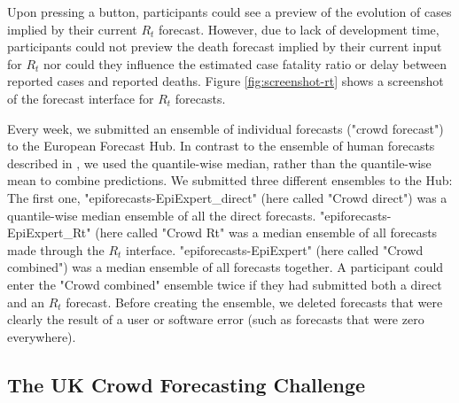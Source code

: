 \documentclass[10pt,a4paper,twocolumn]{article}
\begin{document}
Upon pressing a button, participants could see a preview of the evolution of cases implied by their current $R_t$ forecast. However, due to lack of development time, participants could not preview the death forecast implied by their current input for $R_t$ nor could they influence the estimated case fatality ratio or delay between reported cases and reported deaths. Figure \ref{fig:screenshot-rt} shows a screenshot of the forecast interface for $R_t$ forecasts. 

Every week, we submitted an ensemble of individual forecasts ("crowd forecast") to the European Forecast Hub. In contrast to the ensemble of human forecasts described in \citet{bosseComparingHumanModelbased2022}, we used the quantile-wise median, rather than the quantile-wise mean to combine predictions. %
We submitted three different ensembles to the Hub: The first one, "epiforecasts-EpiExpert\_direct" (here called "Crowd direct") was a quantile-wise median ensemble of all the direct forecasts. "epiforecasts-EpiExpert\_Rt" (here called "Crowd Rt" was a median ensemble of all forecasts made through the $R_t$ interface. "epiforecasts-EpiExpert" (here called "Crowd combined") was a median ensemble of all forecasts together. A participant could enter the "Crowd combined" ensemble twice if they had submitted both a direct and an $R_t$ forecast. Before creating the ensemble, we deleted forecasts that were clearly the result of a user or software error (such as forecasts that were zero everywhere).

\subsection*{The UK Crowd Forecasting Challenge}
\end{document}
